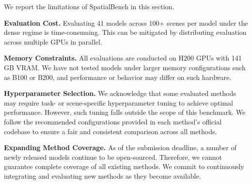 \documentclass{llmxive}
\providecommand{\benchmark}{SpatialBench\xspace}
\begin{document}
We report the limitations of \benchmark in this section.

\noindent\textbf{Evaluation Cost.} 
Evaluating 41 models across 100+ scenes per model under the dense regime is time-consuming. This can be mitigated by distributing evaluation across multiple GPUs in parallel.

\noindent\textbf{Memory Constraints.}
All evaluations are conducted on H200 GPUs with 141\,GB VRAM. 
%
We have not tested models under larger memory configurations such as B100 or B200, and performance or behavior may differ on such hardware.

\noindent\textbf{Hyperparameter Selection.}
We acknowledge that some evaluated methods may require task- or scene-specific hyperparameter tuning to achieve optimal performance. However, such tuning falls outside the scope of this benchmark. We follow the recommended configurations provided in each method's official codebase to ensure a fair and consistent comparison across all methods.

\noindent\textbf{Expanding Method Coverage.}
As of the submission deadline, a number of newly released models continue to be open-sourced. 
%
Therefore, we cannot guarantee complete coverage of all existing methods.
%
We commit to continuously integrating and evaluating new methods as they become available.

\end{document}
